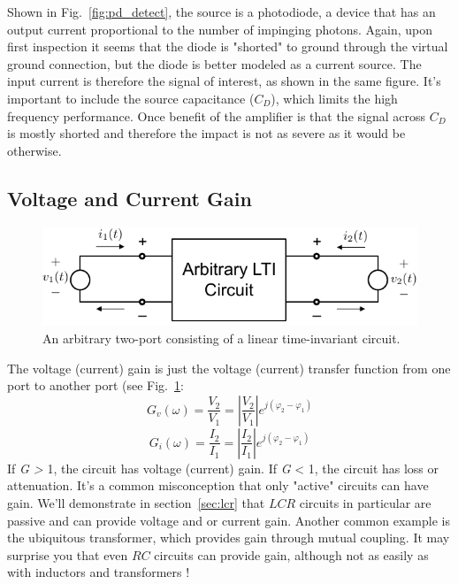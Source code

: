 Shown in Fig.~\ref{fig:pd_detect}, the source is a photodiode, a device that has an output current proportional to the number of impinging photons.  Again, upon first inspection it seems that the diode is "shorted" to ground through the virtual ground connection, but the diode is better modeled as a current source.  The input current is therefore the signal of interest, as shown in the same figure.  It's important to include the source capacitance ($C_D$), which limits the high frequency performance.  Once benefit of the amplifier is that the signal across $C_D$ is mostly shorted and therefore the impact is not as severe as it would be otherwise.










\subsection{Voltage and Current Gain}

\begin{figure}[tb]
\begin{center}
\includegraphics[width=.6\columnwidth]{mod1_3_1_twoport}
\end{center}
\caption{An arbitrary two-port consisting of a linear time-invariant circuit.} \label{fig:twoportivgain}
\end{figure}


The voltage (current) gain is just the voltage (current) transfer function from one port to another port (see Fig.~\ref{fig:twoportivgain}:
\begin{equation}
{G_v}(\omega ) = \frac{{{V_2}}}{{{V_1}}} = \left| {\frac{{{V_2}}}{{{V_1}}}} \right|{e^{j({\varphi _2} - {\varphi _1})}}
\end{equation}
\begin{equation}
{G_i}(\omega ) = \frac{{{I_2}}}{{{I_1}}} = \left| {\frac{{{I_2}}}{{{I_1}}}} \right|{e^{j({\varphi _2} - {\varphi _1})}}
\end{equation}
If \textit{G > }1, the circuit has voltage (current) gain.   If \textit{G} < 1, the circuit has loss or attenuation.   It's a common misconception that only "active" circuits can have gain.  We'll demonstrate in section~\ref{sec:lcr} that $LCR$ circuits in particular are passive and can provide voltage and or current gain.  Another common example is the ubiquitous transformer, which provides gain through mutual coupling.  It may surprise you that even $RC$ circuits can provide gain, although not as easily as with inductors and transformers !
 


